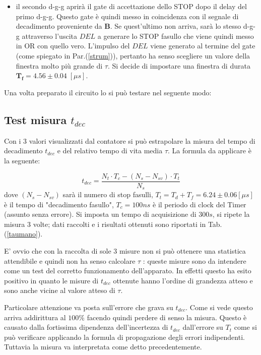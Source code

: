 \documentclass[12pt,a4paper,openright,twoside]{article}
\numberwithin{equation}{section} %
\begin{document}
\begin{itemize}
\begin{itemize}
\item il secondo d-g-g aprirà il gate di accettazione dello STOP dopo il delay del primo d-g-g. Questo gate è quindi messo in coincidenza con il segnale di decadimento proveniente da \textbf{B}. Se quest'ultimo non arriva, sarà lo stesso d-g-g attraverso l'uscita $DEL$ a generare lo STOP fasullo che viene quindi messo in OR con quello vero. L'impulso del $DEL$ viene generato al termine del gate (come spiegato in Par.(\ref{strum})), pertanto ha senso scegliere un valore della finestra molto più grande di $\tau$. Si decide di impostare una finestra di durata $\mathbf{T_{f}}=4.56 \pm 0.04 \; [\mu s]$.
\end{itemize}
\end{itemize}



Una volta preparato il circuito lo si può testare nel seguente modo:



\subsection{Test misura $t_{dec}$}

Con i 3 valori visualizzati dal contatore si può estrapolare la misura del tempo di decadimento $t_{dec}$ e del relativo tempo di vita media $\tau$. La formula da applicare è la seguente:

\begin{equation}
t_{dec} = \frac{N_t \cdot T_c - (N_s - N_{sv})\cdot T_t}{N_s}
\end{equation}
dove $(N_s - N_{sv})$ sarà il numero di stop fasulli, $T_t=T_d + T_f = 6.24 \pm 0.06 [\mu s]$ è il tempo di "decadimento fasullo", $T_c= 100 ns$ è il periodo di clock del Timer (assunto senza errore).
Si imposta un tempo di acquisizione di $300s$, si ripete la misura 3 volte; dati raccolti e i risultati ottenuti sono riportati in Tab.(\ref{taumano}).

E' ovvio che con la raccolta di sole 3 misure non si può ottenere una statistica attendibile e quindi non ha senso calcolare $\tau$ : queste misure sono da intendere come un test del corretto funzionamento dell'apparato. In effetti questo ha esito positivo in quanto le misure di $t_{dec}$ ottenute hanno l'ordine di grandezza atteso e sono anche vicine al valore atteso di $\tau$.

Particolare attenzione va posta sull'errore che grava su $t_{dec}$. Come si vede questo arriva addirittura al $100 \%$ facendo quindi perdere di senso la misura. Questo è causato dalla fortissima dipendenza dell'incertezza di $t_{dec}$ dall'errore su $T_t$ come si può verificare applicando la formula di propagazione degli errori indipendenti. Tuttavia la misura va interpretata come detto precedentemente.
\end{document}
